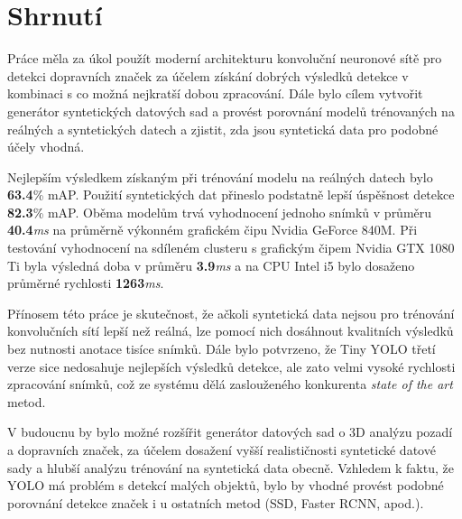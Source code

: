 \documentclass[czech]{ExcelAtFIT} %
\begin{document}
\section{Shrnutí}
Práce měla za úkol použít moderní architekturu konvoluční neuronové sítě pro detekci dopravních značek za účelem získání dobrých výsledků detekce v kombinaci s co možná nejkratší dobou zpracování. Dále bylo cílem vytvořit generátor syntetických datových sad a provést porovnání modelů trénovaných na reálných a syntetických datech a zjistit, zda jsou syntetická data pro podobné účely vhodná.

Nejlepším výsledkem získaným při trénování modelu na reálných datech bylo \textbf{63.4}\% mAP. Použití syntetických dat přineslo podstatně lepší úspěšnost detekce \textbf{82.3}\% mAP. Oběma modelům trvá vyhodnocení jednoho snímků v průměru \textbf{40.4}\emph{ms} na průměrně výkonném grafickém čipu Nvidia GeForce 840M. Při testování vyhodnocení na sdíleném clusteru s grafickým čipem Nvidia GTX 1080 Ti byla výsledná doba v průměru \textbf{3.9}\emph{ms} a na CPU Intel i5 bylo dosaženo průměrné rychlosti \textbf{1263}\emph{ms}.

Přínosem této práce je skutečnost, že ačkoli syntetická data nejsou pro trénování konvolučních sítí lepší než reálná, lze pomocí nich dosáhnout kvalitních výsledků bez nutnosti anotace tisíce snímků. Dále bylo potvrzeno, že Tiny YOLO třetí verze sice nedosahuje nejlepších výsledků detekce, ale zato velmi vysoké rychlosti zpracování snímků, což ze systému dělá zaslouženého konkurenta \emph{state of the art} metod.

V budoucnu by bylo možné rozšířit generátor datových sad o 3D analýzu pozadí a dopravních značek, za účelem dosažení vyšší realističnosti syntetické datové sady a hlubší analýzu trénování na syntetická data obecně. Vzhledem k faktu, že YOLO má problém s detekcí malých objektů, bylo by vhodné provést podobné porovnání detekce značek i u ostatních metod (SSD, Faster RCNN, apod.).

\end{document}
